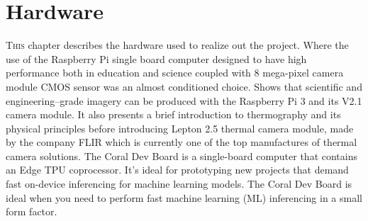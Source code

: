 \chapter{Hardware}
\label{chap:hardware}
\lettrine[lines=3]{T}{his} chapter describes the hardware used to realize out
the project. Where the use of the Raspberry Pi single board computer designed to
have high performance both in education and science coupled with 8 mega-pixel
camera module CMOS sensor was an almost conditioned choice. Shows that
scientific and engineering--grade imagery can be produced with the Raspberry Pi
3 and its V2.1 camera module. It also presents a brief introduction to
thermography and its physical principles before introducing Lepton 2.5 thermal
camera module, made by the company FLIR which is currently one of the top
manufactures of thermal camera solutions. The Coral Dev Board is a single-board
computer that contains an Edge TPU coprocessor. It's ideal for prototyping new
projects that demand fast on-device inferencing for machine learning models. The
Coral Dev Board is ideal when you need to perform fast machine learning (ML)
inferencing in a small form factor.
%




